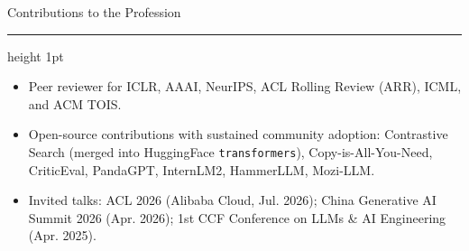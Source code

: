 \documentclass[10.5pt]{article}
\newcommand{\cvsection}[1]{%
  \vspace{10pt}
  {\color{accent}\headingfont\Large #1}\par
  \vspace{2pt}
  {\color{accent}\hrule height 1pt}
  \vspace{6pt}
}
\begin{document}
\cvsection{Contributions to the Profession}
\begin{itemize}
  \item Peer reviewer for ICLR, AAAI, NeurIPS, ACL Rolling Review (ARR), ICML, and ACM TOIS.
  \item Open-source contributions with sustained community adoption: Contrastive Search (merged into HuggingFace \texttt{transformers}), Copy-is-All-You-Need, CriticEval, PandaGPT, InternLM2, HammerLLM, Mozi-LLM.
  \item Invited talks: ACL 2026 (Alibaba Cloud, Jul. 2026); China Generative AI Summit 2026 (Apr. 2026); 1st CCF Conference on LLMs \& AI Engineering (Apr. 2025).
\end{itemize}
\end{document}
